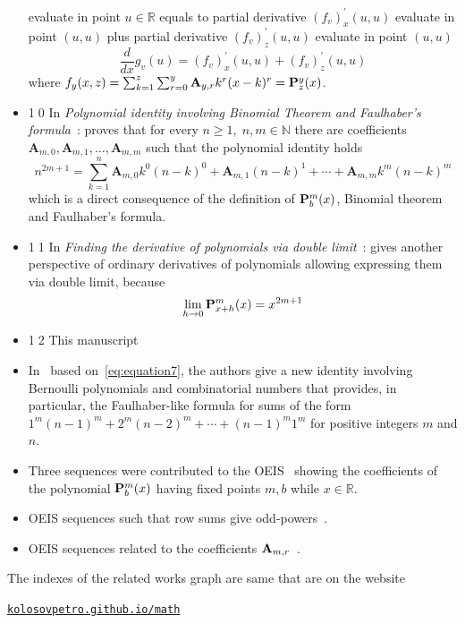 \begin{itemize}
    evaluate in point $u\in\mathbb{R}$ equals to partial derivative $(f_{v})^{'}_{x} (u, u)$ evaluate in point $(u, u)$ plus
    partial derivative $(f_{v})^{'}_{z} (u, u)$ evaluate in point $(u, u)$
    \begin{equation}
        \frac{d}{dx} g_v (u) = (f_{v})^{'}_{x} (u, u) + (f_{v})^{'}_{z} (u, u)
        \label{eq:odd-exponential-identity}
    \end{equation}
    where $f_{y} (x, z) = \sum_{k=1}^{z} \sum_{r=0}^{y} {\mathbf{A}} \sb{y,r} k^r (x-k)^r = {\mathbf{P}}\sp{y} \sb{z}(x)$.
    \item {\Large \textcircled{\normalsize 10}}
    In \textit{Polynomial identity involving Binomial Theorem and Faulhaber's formula}~\cite{kolosov2023polynomial}:
    proves that
    for every $n\geq 1, \; n,m\in\mathbb{N}$
    there are coefficients $\mathbf{A}_{m,0}, \mathbf{A}_{m,1}, \ldots, \mathbf{A}_{m,m}$ such that
    the polynomial identity holds
    \[
        n^{2m+1} = \sum_{k=1}^{n} \mathbf{A}_{m,0} k^0 (n-k)^0 + \mathbf{A}_{m,1}(n-k)^1
        + \cdots + \mathbf{A}_{m,m} k^m (n-k)^m
    \]
    which is a direct consequence of the definition of ${\mathbf{P}}\sp{m} \sb{b}(x)$, Binomial theorem and Faulhaber's formula.
    \item {\Large \textcircled{\normalsize 11}}
    In \textit{Finding the derivative of polynomials via double limit}~\cite{kolosov_2024_10575485}:
    gives another perspective of ordinary derivatives of polynomials allowing expressing
    them via double limit, because
    \begin{align*}
        \lim_{h \to 0} {\mathbf{P}}\sp{m} \sb{x+h}(x) = x^{2m+1}
    \end{align*}
    \item {\Large \textcircled{\normalsize 12}} This manuscript
    \item In~\cite{barbero2020two} based on~\eqref{eq:equation7}, the authors give a new identity involving
    Bernoulli polynomials and combinatorial numbers that provides,
    in particular, the Faulhaber-like formula for sums of the form $1^m(n-1)^m + 2^m (n -2)^m + \cdots + (n - 1)^m 1^m$
    for positive integers $m$ and $n$.
    \item Three sequences were contributed to the
    OEIS~\cite{kolosov2018coefficientspolynomial1, kolosov2018coefficientspolynomial2, kolosov2018coefficientspolynomial3}
    showing the coefficients of the polynomial ${\mathbf{P}}\sp{m} \sb{b}(x)$ having fixed points $m,b$ while $x\in\mathbb{R}$.
    \item OEIS sequences such that row sums give odd-powers~\cite{kolosov2017third, kolosov2018fifth, kolosov2018seventh}.
    \item OEIS sequences related to the coefficients ${\mathbf{A}} \sb{m,r}$~\cite{kolosov2018numerator, kolosov2018denominator}.
\end{itemize}
The indexes of the related works graph are same that are on the website
\begin{center}
    \href{https://kolosovpetro.github.io/math/}{\texttt{kolosovpetro.github.io/math}}
\end{center}
